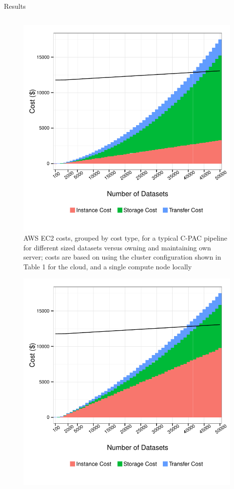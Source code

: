 \documentclass[final,hyperref={pdfpagelabels=false}]{beamer}
\begin{document}
\begin{frame}
\begin{columns}
\begin{column}{.5\textwidth}
{\begin{block}{Results}
\begin{column}{.47\textwidth}
              \begin{figure}
                  \includegraphics[width=.99\textwidth]{cpac-costs.pdf}
                  \caption{\label{fig:cpac-costs}AWS EC2 costs, grouped by cost type, for a typical C-PAC pipeline for different sized datasets versus owning and maintaining own server; costs are based on using the cluster configuration shown in Table 1 for the cloud, and a single compute node locally}
              \end{figure}
              \begin{figure}
                  \includegraphics[width=.99\textwidth]{fs-costs.pdf}

\end{figure}
\end{column}
\end{block}}
\end{column}
\end{columns}
\end{frame}
\end{document}
